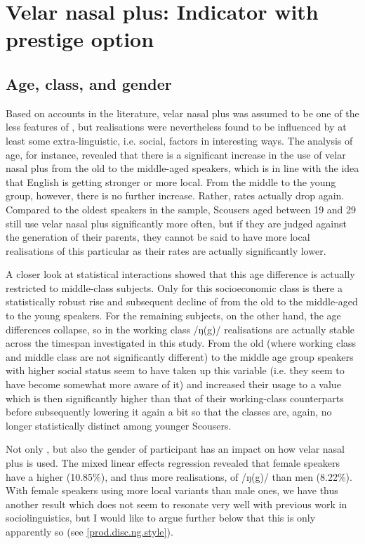 \section{Velar nasal plus: Indicator with prestige option}
\label{prod.disc.ng}

\subsection{Age, class, and gender}
\label{prod.disc.ng.social}

Based on accounts in the literature, velar nasal plus was assumed to be one of the less  features of , but realisations were nevertheless found to be influenced by at least some extra-linguistic, i.e. social, factors in interesting ways.
The analysis of age, for instance, revealed that there is a significant increase in the use of velar nasal plus from the old to the middle-aged speakers, which is in line with the idea that  English is getting stronger or more local.
From the middle to the young group, however, there is no further increase.
Rather,  rates actually drop again.
Compared to the oldest speakers in the sample, Scousers aged between 19 and 29 still use velar nasal plus significantly more often, but if they are judged against the generation of their parents, they cannot be said to have more local realisations of this particular  as their rates are actually significantly lower.

A closer look at statistical interactions showed that this age difference is actually restricted to middle-class subjects.
Only for this socioeconomic class is there a statistically robust rise and subsequent decline of  from the old to the middle-aged to the young speakers.
For the remaining subjects, on the other hand, the age differences collapse, so in the working class /ŋ(g)/ realisations are actually stable across the timespan investigated in this study.
From the old (where working class and middle class are not significantly different) to the middle age group speakers with higher social status seem to have taken up this variable (i.e. they seem to have become somewhat more aware of it) and increased their usage to a value which is then significantly higher than that of their working-class counterparts before subsequently lowering it again a bit so that the classes are, again, no longer statistically distinct among younger Scousers.

Not only , but also the gender of participant has an impact on how velar nasal plus is used.
The mixed linear effects regression revealed that female speakers have a higher  (10.85\%), and thus more  realisations, of /ŋ(g)/ than men (8.22\%).
With female speakers using more local variants than male ones, we have thus another result which does not seem to resonate very well with previous work in sociolinguistics, but I would like to argue further below that this is only apparently so (see \ref{prod.disc.ng.style}).

